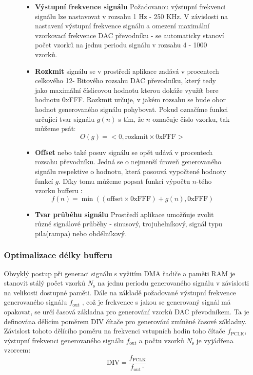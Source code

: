 \begin{figure}[H]
\begin{minipage}{0.3\linewidth}
\end{minipage}
\noindent
\begin{minipage}{0.69\linewidth}	
		\begin{itemize}
			\item \textbf{Výstupní frekvence signálu} Požadovanou výstupní frekvenci signálu lze nastavovat v rozsahu 1 Hz - 250 KHz. V závislosti na nastavení výstupní frekvence signálu a omezení maximální vzorkovací frekvence DAC převodníku - se automaticky stanoví počet vzorků na jednu periodu signálu v rozsahu 4 - 1000 vzorků. 
			\item \textbf{Rozkmit} signálu se v prostředí aplikace zadává v procentech celkového 12- Bitového rozsahu DAC převodníku, který tedy jako maximální číslicovou hodnotu kterou dokáže využít bere hodnotu 0xFFF. Rozkmit určuje, v jakém rozsahu se bude obor hodnot generovaného signálu pohybovat. Pokud označíme funkci určující tvar signálu $g(n)$ s tím, že $n$ označuje číslo vzorku, tak můžeme psát:
			\begin{equation}
				O(g)=<0,\text{rozkmit}\times\text{0xFFF}>
			\end{equation}
			\item \textbf{Offset} nebo také posuv signálu se opět udává v procentech rozsahu převodníku. Jedná se o nejmenší úroveň generovaného signálu respektive o hodnotu, která  posouvá vypočtené hodnoty funkcí $g$. Díky tomu můžeme popsat funkci výpočtu $n$-tého vzorku bufferu :
					\begin{equation}
				f(n)=\min{\left({(\text{offset}\times\text{0xFFF})+g(n),\text{0xFFF}}\right)}
			\end{equation}
			\item \textbf{Tvar průběhu signálu} Prostředí aplikace umožňuje zvolit různé signálové průběhy - sinusový, trojuhelníkový, signál typu pila(rampa) nebo obdélníkový.			
		\end{itemize}
		
\end{minipage}
\end{figure}

\subsubsection{Optimalizace délky bufferu}
Obvyklý postup při generaci signálu s vyžitím DMA řadiče a paměti RAM je stanovit stálý počet vzorků $N_\text{s}$ na jednu periodu generovaného signálu v závislosti na velikosti dostupné paměti. Dále na základě požadované výstupní frekvence generovaného signálu $f_{\text{out}}$ , což je frekvence s jakou se generovaný signál má opakovat, se určí časová základna pro generování vzorků DAC převodníkem. Ta je definována dělícím poměrem DIV čítače pro generování zmíněné časové základny. Závislost tohoto dělícího poměru na frekvenci vstupních hodin toho čítače $f_{\text{PCLK}}$, výstupní frekvenci  generovaného signálu $f_{\text{out}}$ a počtu vzorků $N_\text{s}$ je vyjádřena vzorcem:
\begin{equation}
	\text{DIV}=\frac{f_{\text{PCLK}}}{	f_{\text{out}}\cdot }
\end{equation} 

